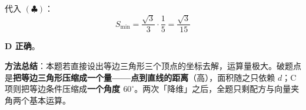 \begin{answer}
代入 $(\clubsuit)$：
\nopagebreak[4]
\[S_{\min}=\frac{\sqrt3}{3}\cdot\frac15=\frac{\sqrt3}{15}\]

 \textbf{D 正确}。

\begin{gktip}
\textbf{方法总结}：本题若直接设出等边三角形三个顶点的坐标去解，运算量极大。破题点是\textbf{把等边三角形压缩成一个量——点到直线的距离}（高），面积随之只依赖 $d$；C 项则把等边条件压缩成\textbf{一个角度 $60^\circ$}。两次「降维」之后，全题只剩配方与向量夹角两个基本运算。
\end{gktip}


\par\medskip

\end{answer}

